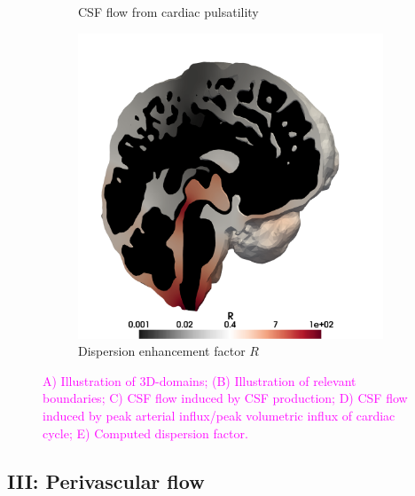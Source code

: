 \documentclass[fleqn,10pt]{wlscirep}
\newcommand{\mer}[1]{\textcolor{magenta}{#1}}
\newcommand{\draft}[1]{\textcolor{gray}{#1}}
\begin{document}
\begin{figure}[h!]
\begin{subfigure}[b]{0.33\textwidth}
\caption{CSF flow  from cardiac pulsatility}
\label{fig:csf_flow_cardiac}
\end{subfigure}
\begin{subfigure}[b]{0.33\textwidth}
\includegraphics[width = 1 \textwidth]{figures/R.png} 
\caption{Dispersion enhancement factor $R$}
\label{fig:visualize_R}
\end{subfigure}
\caption{\mer{A) Illustration of 3D-domains; (B) Illustration of
    relevant boundaries; C) CSF flow induced by CSF production; D) CSF
    flow induced by peak arterial influx/peak volumetric influx of
    cardiac cycle; E) Computed dispersion factor.}}
\label{fig:csf}
\end{figure}  

\subsection*{III: Perivascular flow}

\draft{\lipsum[1]}
\end{document}
